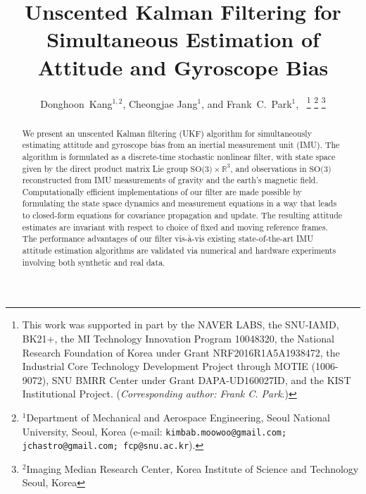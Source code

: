 \documentclass[letterpaper, 10 pt, conference]{ieeeconf}  %
\title{\LARGE \bf
Unscented Kalman Filtering for Simultaneous Estimation of
Attitude and Gyroscope Bias
}
\author{Donghoon~Kang$^{1, 2}$, \IEEEmembership{Member,~IEEE,} Cheongjae Jang$^{1}$,
 and Frank~C.~Park$^{1}$,~\IEEEmembership{Fellow,~IEEE}%
\thanks{This work was supported in part by the NAVER LABS, 
the SNU-IAMD, BK21+, the MI Technology Innovation Program 10048320,
the National Research Foundation of Korea under Grant
NRF2016R1A5A1938472, the Industrial Core Technology Development
Project through MOTIE (1006-9072), SNU BMRR
Center under Grant DAPA-UD160027ID, and the KIST Institutional
Project. (\emph{Corresponding author: Frank C. Park}.)}%
\thanks{$^{1}$Department of Mechanical and Aerospace Engineering,
        Seoul National University, Seoul, Korea
        (e-mail:
        {\tt\small kimbab.moowoo@gmail.com; jchastro@gmail.com; fcp@snu.ac.kr}).}%
\thanks{$^{2}$Imaging Median Research Center, Korea Institute of Science and Technology
        Seoul, Korea
        }%
}
\begin{document}
\maketitle
\thispagestyle{empty}
\pagestyle{empty}


\begin{abstract}
We present an unscented Kalman filtering (UKF) algorithm for simultaneously
estimating attitude and gyroscope bias from an inertial measurement unit
(IMU).  The algorithm is formulated as a discrete-time stochastic nonlinear
filter, with state space given by the direct product matrix Lie group
$\mbox{SO(3)} \times \mathbb{R}^3$, and observations in $\mbox{SO(3)}$
reconstructed from IMU measurements of gravity and the earth's magnetic
field.  Computationally efficient implementations of our filter are made
possible by formulating the state space dynamics and measurement equations
in a way that leads to closed-form equations for covariance propagation
and update.  The resulting attitude estimates are invariant with respect
to choice of fixed and moving reference frames.  The performance advantages
of our filter vis-\`{a}-vis existing state-of-the-art IMU attitude
estimation algorithms are validated via numerical and hardware experiments
involving both synthetic and real data.
\end{abstract}
\end{document}
